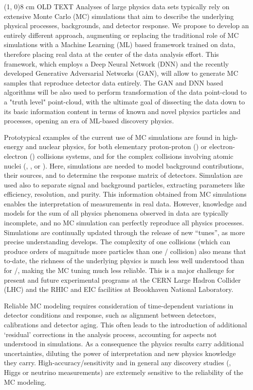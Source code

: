 \line(1, 0){8 cm}
OLD TEXT
Analyses of large physics data sets typically rely on extensive Monte Carlo (MC) simulations that aim to describe the underlying physical processes, backgrounds, and detector response. We propose to develop an entirely different  approach, augmenting or replacing the traditional role of MC simulations with a Machine Learning (ML) based framework trained on data, therefore placing real data at the center of the data analysis effort. This framework, which employs a Deep Neural Network (DNN) and the recently developed Generative Adversarial Networks (GAN), will allow to generate MC samples that reproduce detector data entirely. The GAN and DNN based algorithms will be also used to perform transformation of the data point-cloud to a "truth level" point-cloud, with the ultimate goal of dissecting the data down to its basic information content in terms of known and novel physics particles and processes, opening an era of ML-based discovery physics.

Prototypical examples of the current use of MC simulations are found in high-energy and nuclear physics, for both elementary proton-proton (\pp) or electron-electron (\eecol) collisions systems, and for the complex collisions involving atomic nuclei (\eA, \pA, or \aacol). Here, simulations are needed to model background contributions, their sources, and to determine the response matrix of detectors. Simulation are used also to separate signal and background particles, extracting parameters like efficiency, resolution, and purity. This information obtained from MC simulations enables the interpretation of  measurements in real data. However, knowledge and models for the sum of all physics phenomena observed in data are typically incomplete, and no MC simulation can perfectly reproduce all physics processes. Simulations are continually updated through the release of new ``tunes'', as more precise understanding develops. The complexity of one {\aacol} collisions (which can produce orders of magnitude more particles than one \eecol/{\pp} collision) also means that to-date, the richness of the underlying physics is much less well understood than for \eecol/{\pp}, making the MC tuning much less reliable. This is a major challenge for present and future experimental programs at the CERN Large Hadron Collider (LHC) and the RHIC and EIC facilities at Brookhaven National Laboratory.

Reliable MC modeling requires consideration of time-dependent variations in detector conditions and response, such as alignment between detectors, calibrations and detector aging. This often leads to the introduction of additional `residual' corrections in the analysis process, accounting for aspects not understood in simulations. As a consequence the physics results carry additional uncertainties, diluting the power of interpretation and new physics knowledge they carry. High-accuracy/sensitivity and in general any discovery studies (\eg, Higgs or neutrino measurements) are extremely sensitive to the reliability of the MC modeling.

